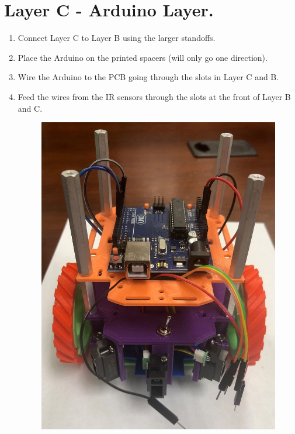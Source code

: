 \documentclass{handout}
\begin{document}
	\section{Layer C - Arduino Layer.}
	\begin{enumerate}
		\item Connect Layer C to Layer B using the larger standoffs.
		\item Place the Arduino on the printed spacers (will only go one direction).
		\item Wire the Arduino to the PCB going through the slots in Layer C and B.
		\item Feed the wires from the IR sensors through the slots at the front of Layer B and C.
		
		\begin{figure} [H]
			\centering
			\includegraphics[width=.45\textwidth]{8.jpg}
		\end{figure}

	\end{enumerate}
\end{document}

